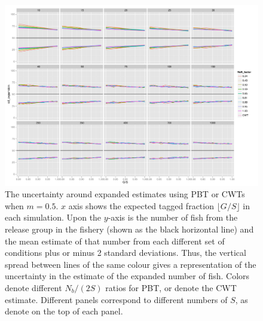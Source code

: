 \documentclass[11pt]{article}
\begin{document}
\begin{figure}
\includegraphics[width = .93\textwidth]{./images/sd_line_horns_m_0_5.pdf}
\caption{The uncertainty around expanded estimates using PBT or CWTs when $m = 0.5$.  $x$ axis shows the
expected tagged fraction $\lfloor G/S \rfloor$ in each simulation. Upon the $y$-axis is the number of fish from the
release group in the fishery (shown as the black horizontal line) and the mean estimate of that number from each different set of 
conditions plus or minus 2 standard deviations.  Thus, the vertical spread between lines of the same colour gives a representation
of the uncertainty in the estimate of the expanded number of fish. Colors denote different $N_b/(2S)$ ratios for PBT, or denote
the CWT estimate.  Different
panels correspond to different numbers of $S$, as denote on the top of each panel.
\label{fig:all_sds}}
\end{figure}
\end{document}
